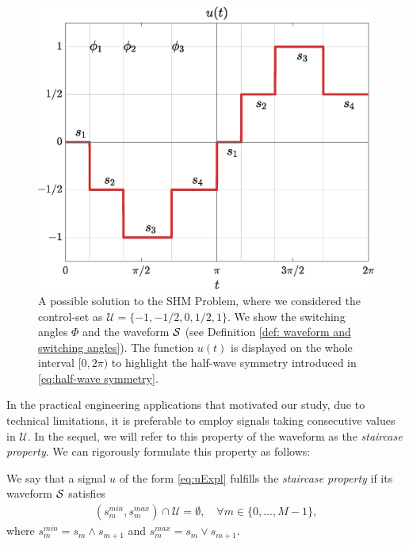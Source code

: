 \documentclass[9pt,shortpaper,twoside,web]{ieeecolor}
\begin{document}
\begin{figure}[h]
	\centering
	\includegraphics[scale=0.35]{img/fig01.eps} 
	\caption{A possible solution to the SHM Problem, where we considered the control-set as $\mathcal{U} = \{-1, -1/2, 0, 1/2, 1\}$. We show the switching angles $\Phi$ and the waveform $\mathcal{S}$ (see Definition \ref{def: waveform and switching angles}). The function $u(t)$ is displayed on the whole interval $[0,2\pi)$ to highlight the half-wave symmetry introduced in \eqref{eq:half-wave symmetry}.}
	\label{fig:exampleSHE}
\end{figure}

In the practical engineering applications that motivated our study, due to technical limitations, it is preferable to employ signals taking consecutive values in $\mathcal{U}$. In the sequel, we will refer to this property of the waveform as the \emph{staircase property}. We can rigorously formulate this property as follows: 

\begin{definition}\label{def:staircase prop}
	We say that a signal $u$ of the form \eqref{eq:uExpl} fulfills the \emph{staircase property} if its waveform $\mathcal{S}$ satisfies
	\begin{gather}\label{eq:staircase prop}
		(s_m^{min},s_{m}^{max}) \cap \mathcal{U} = \emptyset, \quad \forall m\in \{ 0, \ldots, M-1 \},
	\end{gather}
	where $s^{min}_m = s_m\wedge s_{m+1}$ and $s^{max}_m = s_m \vee s_{m+1}.$
\end{definition}
\end{document}
